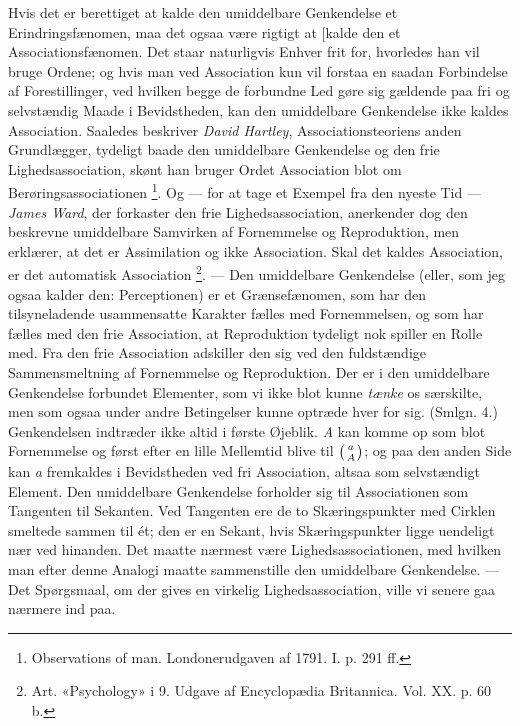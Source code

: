 \documentclass[12pt,a4paper,openany]{book}
\newcommand{\opage}[1]{\marginnote{\footnotesize\textit{[#1]}}}
\begin{document}
Hvis det er berettiget at kalde den umiddelbare Genkendelse et
Erindringsfænomen, maa det ogsaa være rigtigt at [kalde den et
Associationsfænomen. Det staar naturligvis Enhver frit for, hvorledes han vil
bruge Ordene; og hvis man ved Association kun vil forstaa en saadan Forbindelse
af Forestillinger, ved hvilken begge de forbundne Led gøre sig gældende paa fri
og selvstændig Maade i Bevidstheden, kan den umiddelbare Genkendelse ikke
kaldes Association. Saaledes beskriver \emph{David Hartley},
Associationsteoriens anden Grundlægger, tydeligt baade den umiddelbare
Genkendelse og den frie Lighedsassociation, skønt han bruger Ordet Association
blot om Berøringsassociationen%
\footnote[1]{Observations of man. Londonerudgaven af 1791. I. p. 291 ff.}. Og
--- for at tage et Exempel fra den nyeste Tid --- \emph{James Ward}, der
forkaster den frie Lighedsassociation, anerkender dog den beskrevne umiddelbare
Samvirken af Fornemmelse
\setcounter{footnote}{0}%
\opage{16}og Reproduktion, men erklærer, at det er Assimilation og ikke
Association. Skal det kaldes Association, er det automatisk Association%
\footnote[1]{Art. «Psychology» i 9. Udgave af Encyclopædia Britannica. Vol. XX.
p. 60 b.}. --- Den umiddelbare Genkendelse (eller, som jeg ogsaa kalder den:
Perceptionen) er et Grænsefænomen, som har den tilsyneladende usammensatte
Karakter fælles med Fornemmelsen, og som har fælles med den frie Association,
at Reproduktion tydeligt nok spiller en Rolle med. Fra den frie Association
adskiller den sig ved den fuldstændige Sammensmeltning af Fornemmelse og
Reproduktion. Der er i den umiddelbare Genkendelse forbundet Elementer, som vi
ikke blot kunne \emph{tænke} os særskilte, men som ogsaa under andre
Betingelser kunne optræde hver for sig. (Smlgn. 4.) Genkendelsen indtræder ikke
altid i første Øjeblik. \textit{A} kan komme op som blot Fornemmelse og først
efter en lille Mellemtid blive til $\left({a\atop A}\right)$; og paa den anden
Side kan \textit{a} fremkaldes i Bevidstheden ved fri Association, altsaa som
selvstændigt Element. Den umiddelbare Genkendelse forholder sig til
Associationen som Tangenten til Sekanten. Ved Tangenten ere de to
Skæringspunkter med Cirklen smeltede sammen til ét; den er en Sekant, hvis
Skæringspunkter ligge uendeligt nær ved hinanden. Det maatte nærmest være
Lighedsassociationen, med hvilken man efter denne Analogi maatte sammenstille
den umiddelbare Genkendelse. --- Det Spørgsmaal, om der gives en virkelig
Lighedsassociation, ville vi senere gaa nærmere ind paa.
\end{document}
